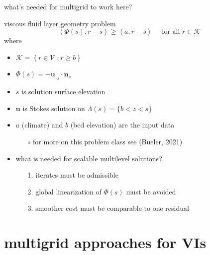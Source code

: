 \documentclass[svgnames,
               hyperref={colorlinks,citecolor=DeepPink4,linkcolor=FireBrick,urlcolor=Maroon},
               usepdftitle=false]  %
               {beamer}
\newcommand{\bn}{\mathbf{n}}
\newcommand{\bu}{\mathbf{u}}
\newcommand{\ip}[2]{\left<#1,#2\right>}
\begin{document}
\begin{frame}{what's needed for multigrid to work here?}

\begin{block}{viscous fluid layer geometry problem}
	$$\ip{\Phi(s)}{r-s} \ge \ip{a}{r-s} \quad \text{ for all } r \in \mathcal{K}$$
where
\begin{itemize}
\item $\mathcal{K} = \left\{r \in \mathcal{V} \,:\, r \ge b\right\}$
\item $\Phi(s)=- \bu|_s \cdot \bn_s$
\item $s$ is solution surface elevation
\item $\bu$ is Stokes solution on $\Lambda(s) = \{b < z < s\}$
\item $a$ (climate) and $b$ (bed elevation) are the input data
\end{itemize} 
\end{block}

\begin{itemize}
\item[]
    \begin{itemize}
    \item[$\circ$] for more on this problem class see (Bueler, 2021)
    \end{itemize}
\end{itemize}

\begin{itemize}
\item {\color{FireBrick} what is needed for scalable multilevel solutions?}
    \begin{enumerate}
    \item[1.] iterates must be admissible
    \item[2.] global linearization of $\Phi(s)$ must be avoided
    \item[3.] smoother cost must be comparable to one residual    
    \end{enumerate}
\end{itemize}
\end{frame}


\section{multigrid approaches for VIs}
\end{document}
